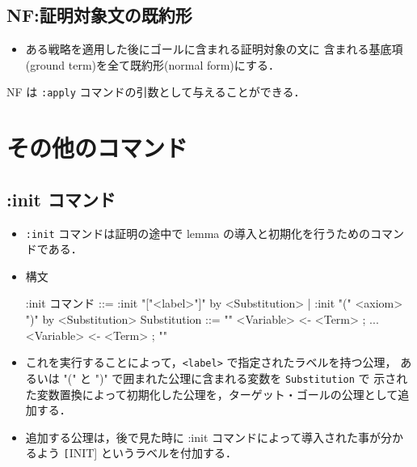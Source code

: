 \documentclass[a4paper,oneside,10pt,here]{memoir}
\def\SP{\mathit{SP}}
\newenvironment{vvtm}%
{\parskip=0pt\lineskip=0pt\begin{center}\begin{minipage}{0.8\textwidth}\begin{snugshade}}%
  {\end{snugshade}\end{minipage}\end{center}}
\begin{document}
\subsection{NF:証明対象文の既約形}\label{sec:normal-form}

\begin{itemize}
\item ある戦略を適用した後にゴールに含まれる証明対象の文に
  含まれる基底項(ground term)を全て既約形(normal form)にする．
\end{itemize}
NF は \verb|:apply| コマンドの引数として与えることができる．




\section{その他のコマンド}\label{sec:other-commands}

\subsection{:init コマンド} 

\begin{itemize}
\item \verb|:init| コマンドは証明の途中で lemma の導入と初期化を行うためのコマンドである．
\item 構文
  \begin{vvtm}
    \begin{simplev}
 :init コマンド ::= :init "["<label>"]" by <Substitution>
                 |  :init "(" <axiom> ")" by <Substitution>
 Substitution ::= "{" <Variable> <- <Term> ; ... <Variable> <- <Term> ; "}"
    \end{simplev}
  \end{vvtm}
\item これを実行することによって，\verb|<label>| で指定されたラベルを持つ公理，
  あるいは "(" と ")" で囲まれた公理に含まれる変数を \verb|Substitution| で
  示された変数置換によって初期化した公理を，ターゲット・ゴールの公理として追加する．
\item 追加する公理は，後で見た時に :init コマンドによって導入された事が分かるよう
 \texttt[INIT] というラベルを付加する．
\end{itemize}
\end{document}
